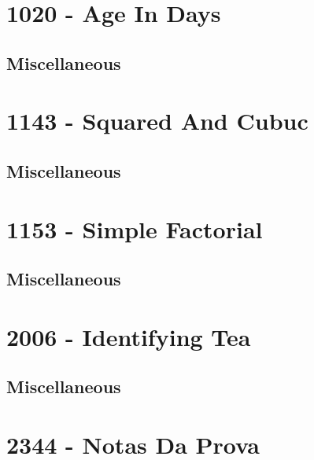 \section{1020 - Age In Days}
\subsection{Miscellaneous}
\raggedbottom
\vspace{-.7\baselineskip}\hrulefill
\vspace{0.1\baselineskip}
\section{1143 - Squared And Cubuc}
\subsection{Miscellaneous}
\raggedbottom
\vspace{-.7\baselineskip}\hrulefill
\vspace{0.1\baselineskip}
\section{1153 - Simple Factorial}
\subsection{Miscellaneous}
\raggedbottom
\vspace{-.7\baselineskip}\hrulefill
\vspace{0.1\baselineskip}
\section{2006 - Identifying Tea}
\subsection{Miscellaneous}
\raggedbottom
\vspace{-.7\baselineskip}\hrulefill
\vspace{0.1\baselineskip}
\section{2344 - Notas Da Prova}
